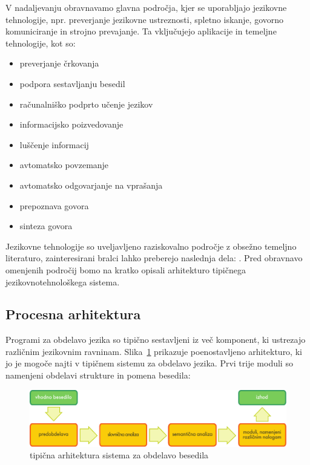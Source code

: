 \begin{multicols}{2}
V nadaljevanju obravnavamo glavna področja, kjer se uporabljajo jezikovne tehnologije, npr. preverjanje jezikovne ustreznosti, spletno iskanje, govorno komuniciranje in strojno prevajanje. Ta vključujejo aplikacije in temeljne tehnologije, kot so:

\begin{itemize}
\item preverjanje črkovanja
\item podpora sestavljanju besedil
\item računalniško podprto učenje jezikov
\item informacijsko poizvedovanje
\item luščenje informacij
\item avtomatsko povzemanje
\item avtomatsko odgovarjanje na vprašanja
\item prepoznava govora
\item sinteza govora
\end{itemize}

Jezikovne tehnologije so uveljavljeno raziskovalno področje z obsežno temeljno literaturo, zainteresirani bralci lahko preberejo naslednja dela: \cite{carstensen-etal1} \cite{jurafsky-martin01} \cite{manning-schuetze1} \cite{lt-world1} \cite{lt-survey1}. Pred obravnavo omenjenih področij bomo na kratko opisali arhitekturo tipičnega jezikovnotehnološkega sistema.

\subsection{Procesna arhitektura}

Programi za obdelavo jezika so tipično sestavljeni iz več komponent, ki ustrezajo različnim jezikovnim ravninam. Slika~\ref{fig:textprocessingarch_de} prikazuje poenostavljeno arhitekturo, ki jo je mogoče najti v tipičnem sistemu za obdelavo jezika. Prvi trije moduli so namenjeni obdelavi strukture in pomena besedila:

\begin{figure}[hb]
  \center
  \includegraphics[width=\textwidth]{../_media/slovene/text_processing_app_architecture}
  \caption{tipična arhitektura sistema za obdelavo besedila}
  \label{fig:textprocessingarch_de}
\end{figure}


\end{multicols}
